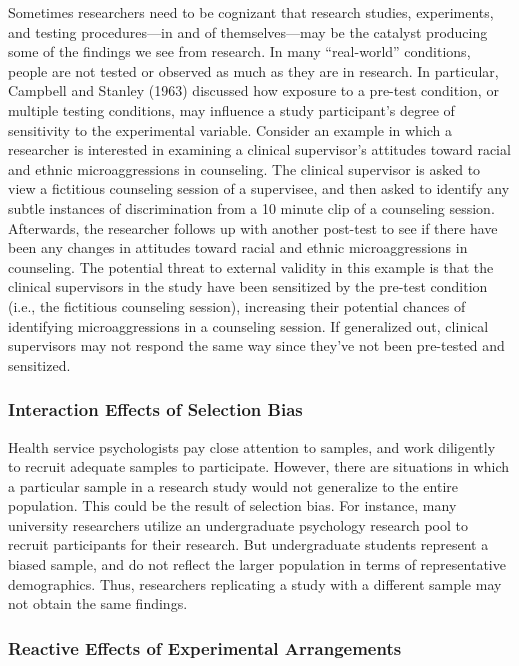 \documentclass[
  11pt,
]{book}
\begin{document}
Sometimes researchers need to be cognizant that research studies, experiments, and testing procedures---in and of themselves---may be the catalyst producing some of the findings we see from research. In many ``real-world'' conditions, people are not tested or observed as much as they are in research. In particular, Campbell and Stanley (1963) discussed how exposure to a pre-test condition, or multiple testing conditions, may influence a study participant's degree of sensitivity to the experimental variable. Consider an example in which a researcher is interested in examining a clinical supervisor's attitudes toward racial and ethnic microaggressions in counseling. The clinical supervisor is asked to view a fictitious counseling session of a supervisee, and then asked to identify any subtle instances of discrimination from a 10 minute clip of a counseling session. Afterwards, the researcher follows up with another post-test to see if there have been any changes in attitudes toward racial and ethnic microaggressions in counseling. The potential threat to external validity in this example is that the clinical supervisors in the study have been sensitized by the pre-test condition (i.e., the fictitious counseling session), increasing their potential chances of identifying microaggressions in a counseling session. If generalized out, clinical supervisors may not respond the same way since they've not been pre-tested and sensitized.

\subsubsection{Interaction Effects of Selection Bias}\label{interaction-effects-of-selection-bias}

Health service psychologists pay close attention to samples, and work diligently to recruit adequate samples to participate. However, there are situations in which a particular sample in a research study would not generalize to the entire population. This could be the result of selection bias. For instance, many university researchers utilize an undergraduate psychology research pool to recruit participants for their research. But undergraduate students represent a biased sample, and do not reflect the larger population in terms of representative demographics. Thus, researchers replicating a study with a different sample may not obtain the same findings.

\subsubsection{Reactive Effects of Experimental Arrangements}\label{reactive-effects-of-experimental-arrangements}
\end{document}
